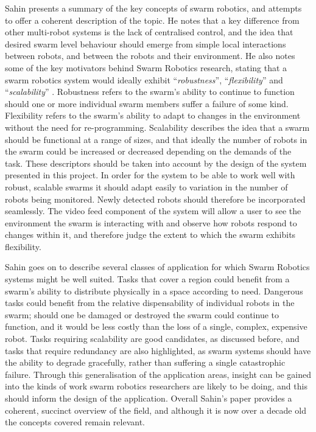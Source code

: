 Sahin \cite{Sahin:2004} presents a summary of the key concepts of swarm robotics, and attempts to offer a coherent description of the topic. He notes that a key difference from other multi-robot systems is the lack of centralised control, and the idea that desired swarm level behaviour should emerge from simple local interactions between robots, and between the robots and their environment. He also notes some of the key motivators behind Swarm Robotics research, stating that a swarm robotics system would ideally exhibit ``\textit{robustness}'', ``\textit{flexibility}'' and ``\textit{scalability}'' \cite{Sahin:2004}. Robustness refers to the swarm's ability to continue to function should one or more individual swarm members suffer a failure of some kind. Flexibility refers to the swarm's ability to adapt to changes in the environment without the need for re-programming. Scalability describes the idea that a swarm should be functional at a range of sizes, and that ideally the number of robots in the swarm could be increased or decreased depending on the demands of the task. These descriptors should be taken into account by the design of the system presented in this project. In order for the system to be able to work well with robust, scalable swarms it should adapt easily to variation in the number of robots being monitored. Newly detected robots should therefore be incorporated seamlessly. The video feed component of the system will allow a user to see the environment the swarm is interacting with and observe how robots respond to changes within it, and therefore judge the extent to which the swarm exhibits flexibility.

Sahin \cite{Sahin:2004} goes on to describe several classes of application for which Swarm Robotics systems might be well suited. Tasks that cover a region could benefit from a swarm's ability to distribute physically in a space according to need. Dangerous tasks could benefit from the relative dispensability of individual robots in the swarm; should one be damaged or destroyed the swarm could continue to function, and it would be less costly than the loss of a single, complex, expensive robot. Tasks requiring scalability are good candidates, as discussed before, and tasks that require redundancy are also highlighted, as swarm systems should have the ability to degrade gracefully, rather than suffering a single catastrophic failure. Through this generalisation of the application areas, insight can be gained into the kinds of work swarm robotics researchers are likely to be doing, and this should inform the design of the application. Overall Sahin's paper \cite{Sahin:2004} provides a coherent, succinct overview of the field, and although it is now over a decade old the concepts covered remain relevant.

